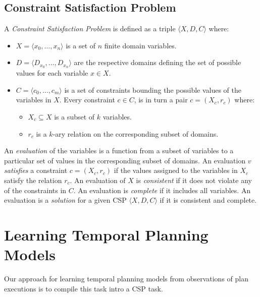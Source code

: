 \documentclass[letterpaper]{article} %
\newcommand{\tup}[1]{{\langle #1 \rangle}}
\begin{document}
\subsection{Constraint Satisfaction Problem}
A {\em Constraint Satisfaction Problem} is defined as a triple $\tup{X,D,C}$ where:
\begin{itemize}
\item $X=\tup{x_0, \ldots, x_n}$ is a set of $n$ finite domain variables.
\item $D=\tup{D_{x_0}, \ldots, D_{x_n}}$ are the respective domains defining the set of possible values for each variable $x\in X$.
\item $C=\tup{c_0, \ldots, c_m}$ is a set of constraints bounding the possible values of the variables in $X$. Every constraint $c\in C$, is in turn a pair $c=(X_c,r_c)$ where:
\begin{itemize}
\item $X_c\subseteq X$ is a subset of $k$ variables.
\item $r_c$ is a $k$-ary relation on the corresponding subset of domains.
\end{itemize}
\end{itemize}

An {\em evaluation} of the variables is a function from a subset of variables to a particular set of values in the corresponding subset of domains. An evaluation $v$ {\em satisfies} a constraint $c=(X_c,r_c)$ if the values assigned to the variables in $X_c$ satisfy the relation $r_c$. An evaluation of $X$ is {\em consistent} if it does not violate any of the constraints in $C$. An evaluation is {\em complete} if it includes all variables. An evaluation is a {\em solution} for a given CSP $\tup{X,D,C}$ if it is consistent and complete. 

\section{Learning Temporal Planning Models}
\label{sec:learning}
Our approach for learning temporal planning models from observations of plan executions is to compile this task intro a CSP task. 
\end{document}
